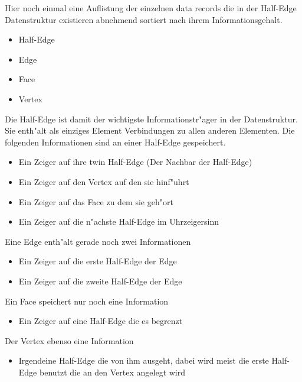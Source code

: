 \documentclass[pagesize, paper=a4, fontsize=12pt,titlepage=true, headings=small, headnosepline, abstractoff, liststotoc, nochapterprefix, plainheadsepline]{scrreprt}
\newcommand{\HES}{Half-Edge Datenstruktur }
\begin{document}
Hier noch einmal eine Auflistung der einzelnen data records die in der \HES existieren abnehmend sortiert nach ihrem Informationsgehalt.
\begin{itemize}
\item Half-Edge
\item Edge
\item Face
\item Vertex
\end{itemize}

Die Half-Edge ist damit der wichtigste Informationstr"ager in der Datenstruktur. Sie enth"alt als einziges Element Verbindungen zu allen anderen Elementen.
Die folgenden Informationen sind an einer Half-Edge gespeichert.
\begin{itemize}
\item Ein Zeiger auf ihre twin Half-Edge (Der Nachbar der Half-Edge)
\item Ein Zeiger auf den Vertex auf den sie hinf"uhrt
\item Ein Zeiger auf das Face zu dem sie geh"ort
\item Ein Zeiger auf die n"achste Half-Edge im Uhrzeigersinn
\end{itemize}

Eine Edge enth"alt gerade noch zwei Informationen
\begin{itemize}
\item Ein Zeiger auf die erste Half-Edge der Edge
\item Ein Zeiger auf die zweite Half-Edge der Edge
\end{itemize}

Ein Face speichert nur noch eine Information
\begin{itemize}
\item Ein Zeiger auf eine Half-Edge die es begrenzt
\end{itemize}

Der Vertex ebenso eine Information
\begin{itemize}
\item Irgendeine Half-Edge die von ihm ausgeht, dabei wird meist die erste Half-Edge benutzt die an den Vertex angelegt wird
\end{itemize}
\end{document}
